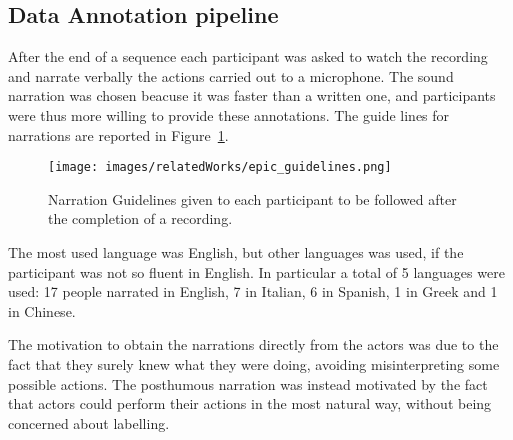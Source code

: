 \subsection{Data Annotation pipeline}
After the end of a sequence each participant was asked to watch the recording and narrate verbally the actions
carried out to a microphone. The sound narration was chosen beacuse it was faster than a written one, and 
participants were thus more willing to provide these annotations.
The guide lines for narrations are reported in Figure~\ref{fig:epic_guidelines}.

\begin{figure}[t]
    \centering
    \texttt{[image: images/relatedWorks/epic\_guidelines.png]} %
    \caption{Narration Guidelines given to each participant to be followed after the completion of a recording.}\label{fig:epic_guidelines}
\end{figure}

The most used language was English, but other languages was used, if the participant was not so fluent in English. In particular
a total of 5 languages were used: 17 people narrated in English, 7 in Italian, 6 in Spanish, 1 in Greek and 1 in Chinese.

The motivation to obtain the narrations directly from the actors was due to the fact that they surely knew what they were doing,
avoiding misinterpreting some possible actions. The posthumous narration was instead motivated by the fact that actors could
perform their actions in the most natural way, without being concerned about labelling.

